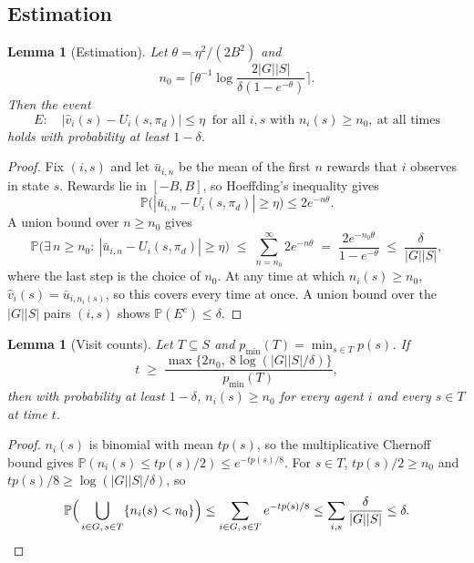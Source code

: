 \documentclass[11pt]{article}
\renewcommand{\Pr}{\mathbb{P}}
\theoremstyle{plain}
\newtheorem{lemma}[theorem]{Lemma}
\theoremstyle{definition}
\theoremstyle{remark}
\begin{document}
\subsection{Estimation}
\begin{lemma}[Estimation]\label{lem:est}
Let $\theta=\eta^2/(2B^2)$ and
\[ n_0=\Big\lceil \theta^{-1}\log\frac{2|G||S|}{\delta(1-e^{-\theta})}\Big\rceil. \]
Then the event
\[ E:\quad |\hat{v}_i(s) - U_i(s, \pi_d)| \leq \eta\ \text{ for all } i,s \text{ with } n_i(s) \geq n_0,\ \text{at all times} \]
holds with probability at least $1-\delta$.
\end{lemma}
\begin{proof}
Fix $(i,s)$ and let $\bar u_{i,n}$ be the mean of the first $n$ rewards that $i$ observes in state $s$. Rewards lie in $[-B,B]$, so Hoeffding's inequality gives
\[ \Pr\big(|\bar u_{i,n}-U_i(s,\pi_d)|\ge\eta\big)\le 2e^{-n\theta}. \]
A union bound over $n\ge n_0$ gives
\[ \Pr\big(\exists\, n\ge n_0:\ |\bar u_{i,n}-U_i(s,\pi_d)|\ge\eta\big)\;\le\;\sum_{n= n_0}^\infty 2e^{-n\theta}\;=\;\frac{2e^{-n_0\theta}}{1-e^{-\theta}}\;\le\;\frac{\delta}{|G||S|}, \]
where the last step is the choice of $n_0$. At any time at which $n_i(s)\ge n_0$, $\hat v_i(s)=\bar u_{i,n_i(s)}$, so this covers every time at once. A union bound over the $|G||S|$ pairs $(i,s)$ shows $\Pr(E^c)\le\delta$.
\end{proof}
 
\begin{lemma}[Visit counts]\label{lem:counts}
Let $T\subseteq S$ and $p_{\min}(T)=\min_{s\in T}p(s)$. If
\[ t\;\ge\;\frac{\max\{2n_0,\ 8\log(|G||S|/\delta)\}}{p_{\min}(T)}, \]
then with probability at least $1-\delta$, $n_i(s)\ge n_0$ for every agent $i$ and every $s\in T$ at time $t$.
\end{lemma}
\begin{proof}
$n_i(s)$ is binomial with mean $tp(s)$, so the multiplicative Chernoff bound gives $\Pr(n_i(s)\le tp(s)/2)\le e^{-tp(s)/8}$. For $s\in T$,
$tp(s)/2\ge n_0$ and $tp(s)/8\ge\log(|G||S|/\delta)$, so
\[ \Pr\Big(\bigcup_{i\in G,\,s\in T}\{n_i(s)< n_0\}\Big)\le\sum_{i\in G,\,s\in T}e^{-tp(s)/8}\le\sum_{i,s}\frac{\delta}{|G||S|}\le\delta. \qedhere \]
\end{proof}
 
\end{document}
